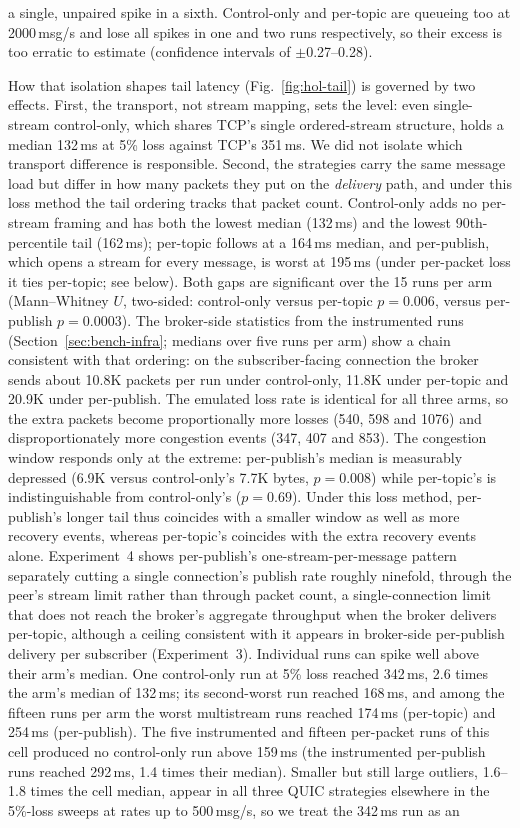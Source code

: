 \documentclass[a4paper,fleqn]{cas-dc}
\begin{document}
a single, unpaired spike in a sixth. Control-only and per-topic are queueing too at 2000\,msg/s and lose all spikes in one and two runs respectively, so their excess is too erratic to estimate (confidence intervals of $\pm$0.27--0.28).

How that isolation shapes tail latency (Fig.~\ref{fig:hol-tail}) is governed by two effects. First, the transport, not stream mapping, sets the level: even single-stream control-only, which shares TCP's single ordered-stream structure, holds a median 132\,ms at 5\% loss against TCP's 351\,ms. We did not isolate which transport difference is responsible. Second, the strategies carry the same message load but differ in how many packets they put on the \emph{delivery} path, and under this loss method the tail ordering tracks that packet count. Control-only adds no per-stream framing and has both the lowest median (132\,ms) and the lowest 90th-percentile tail (162\,ms); per-topic follows at a 164\,ms median, and per-publish, which opens a stream for every message, is worst at 195\,ms (under per-packet loss it ties per-topic; see below). Both gaps are significant over the 15 runs per arm (Mann--Whitney $U$, two-sided: control-only versus per-topic $p=0.006$, versus per-publish $p=0.0003$). The broker-side statistics from the instrumented runs (Section~\ref{sec:bench-infra}; medians over five runs per arm) show a chain consistent with that ordering: on the subscriber-facing connection the broker sends about 10.8K packets per run under control-only, 11.8K under per-topic and 20.9K under per-publish. The emulated loss rate is identical for all three arms, so the extra packets become proportionally more losses (540, 598 and 1076) and disproportionately more congestion events (347, 407 and 853). The congestion window responds only at the extreme: per-publish's median is measurably depressed (6.9K versus control-only's 7.7K bytes, $p=0.008$) while per-topic's is indistinguishable from control-only's ($p=0.69$). Under this loss method, per-publish's longer tail thus coincides with a smaller window as well as more recovery events, whereas per-topic's coincides with the extra recovery events alone. Experiment~4 shows per-publish's one-stream-per-message pattern separately cutting a single connection's publish rate roughly ninefold, through the peer's stream limit rather than through packet count, a single-connection limit that does not reach the broker's aggregate throughput when the broker delivers per-topic, although a ceiling consistent with it appears in broker-side per-publish delivery per subscriber (Experiment~3). Individual runs can spike well above their arm's median. One control-only run at 5\% loss reached 342\,ms, 2.6 times the arm's median of 132\,ms; its second-worst run reached 168\,ms, and among the fifteen runs per arm the worst multistream runs reached 174\,ms (per-topic) and 254\,ms (per-publish). The five instrumented and fifteen per-packet runs of this cell produced no control-only run above 159\,ms (the instrumented per-publish runs reached 292\,ms, 1.4 times their median). Smaller but still large outliers, 1.6--1.8 times the cell median, appear in all three QUIC strategies elsewhere in the 5\%-loss sweeps at rates up to 500\,msg/s, so we treat the 342\,ms run as an 
\end{document}
